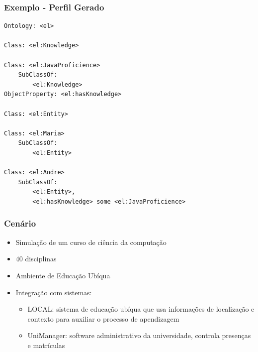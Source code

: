 \documentclass[14pt]{beamer}
\begin{document}

\begin{frame}[fragile]
  \frametitle{Exemplo - Perfil Gerado}
\begin{lstlisting}
Ontology: <el>

Class: <el:Knowledge>

Class: <el:JavaProficience>
    SubClassOf: 
        <el:Knowledge>
ObjectProperty: <el:hasKnowledge>
    
Class: <el:Entity>
    
Class: <el:Maria>
    SubClassOf: 
        <el:Entity>
    
Class: <el:Andre>
    SubClassOf: 
        <el:Entity>,
        <el:hasKnowledge> some <el:JavaProficience>
\end{lstlisting}
  
\end{frame}


\begin{frame}
  \frametitle{Cenário}
  \begin{itemize}
    \item Simulação de um curso de ciência da computação
    \item 40 disciplinas
    \item Ambiente de Educação Ubíqua
    \item Integração com sistemas: 
      \begin{itemize}
        \item LOCAL: sistema de educação ubíqua que usa informações de localização e contexto para auxiliar o processo de apendizagem
        \item UniManager: software administrativo da universidade, controla presenças e matrículas
      \end{itemize}
  \end{itemize}
  
\end{frame}

\end{document}
